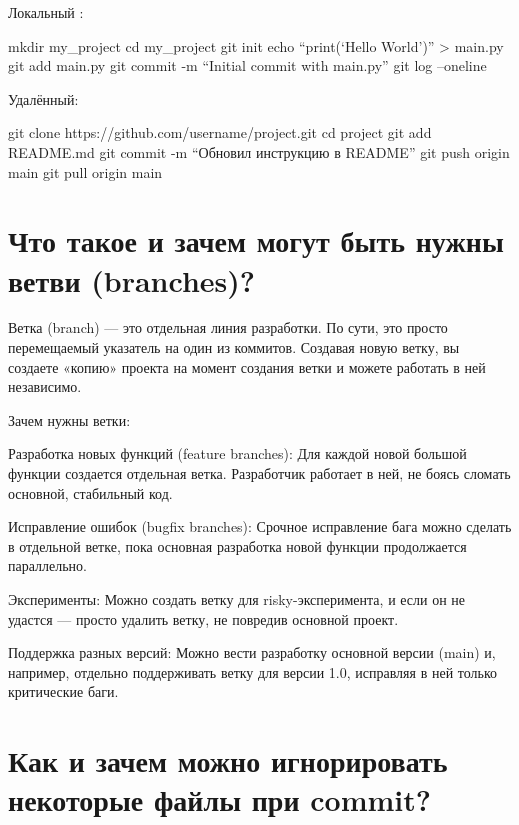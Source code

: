 \documentclass[
  english,
  russian,
  12pt,
  a4paper,
  DIV=11,
  numbers=noendperiod]{scrreprt}
\begin{document}
Локальный :

mkdir my\_project cd my\_project git init echo
\enquote{print(\enquote*{Hello World})} \textgreater{} main.py git add
main.py git commit -m \enquote{Initial commit with main.py} git log
--oneline

Удалённый:

git clone https://github.com/username/project.git cd project git add
README.md git commit -m \enquote{Обновил инструкцию в README} git push
origin main git pull origin main

\section{Что такое и зачем могут быть нужны ветви
(branches)?}\label{ux447ux442ux43e-ux442ux430ux43aux43eux435-ux438-ux437ux430ux447ux435ux43c-ux43cux43eux433ux443ux442-ux431ux44bux442ux44c-ux43dux443ux436ux43dux44b-ux432ux435ux442ux432ux438-branches}

Ветка (branch) --- это отдельная линия разработки. По сути, это просто
перемещаемый указатель на один из коммитов. Создавая новую ветку, вы
создаете «копию» проекта на момент создания ветки и можете работать в
ней независимо.

Зачем нужны ветки:

Разработка новых функций (feature branches): Для каждой новой большой
функции создается отдельная ветка. Разработчик работает в ней, не боясь
сломать основной, стабильный код.

Исправление ошибок (bugfix branches): Срочное исправление бага можно
сделать в отдельной ветке, пока основная разработка новой функции
продолжается параллельно.

Эксперименты: Можно создать ветку для risky-эксперимента, и если он не
удастся --- просто удалить ветку, не повредив основной проект.

Поддержка разных версий: Можно вести разработку основной версии (main)
и, например, отдельно поддерживать ветку для версии 1.0, исправляя в ней
только критические баги.

\section{Как и зачем можно игнорировать некоторые файлы при
commit?}\label{ux43aux430ux43a-ux438-ux437ux430ux447ux435ux43c-ux43cux43eux436ux43dux43e-ux438ux433ux43dux43eux440ux438ux440ux43eux432ux430ux442ux44c-ux43dux435ux43aux43eux442ux43eux440ux44bux435-ux444ux430ux439ux43bux44b-ux43fux440ux438-commit}
\end{document}
